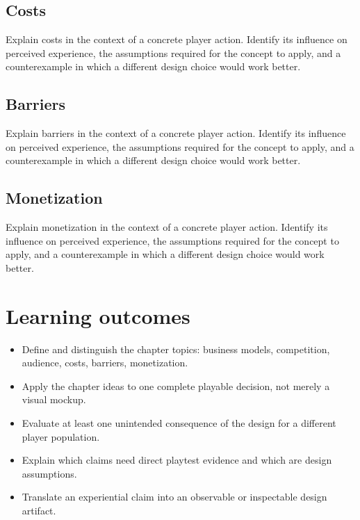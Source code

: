 \documentclass[11pt]{article}
\begin{document}
\subsection{Costs}
Explain costs in the context of a concrete player action. Identify its influence on perceived experience, the assumptions required for the concept to apply, and a counterexample in which a different design choice would work better.


\subsection{Barriers}
Explain barriers in the context of a concrete player action. Identify its influence on perceived experience, the assumptions required for the concept to apply, and a counterexample in which a different design choice would work better.


\subsection{Monetization}
Explain monetization in the context of a concrete player action. Identify its influence on perceived experience, the assumptions required for the concept to apply, and a counterexample in which a different design choice would work better.


\section{Learning outcomes}
\begin{itemize}
\item Define and distinguish the chapter topics: business models, competition, audience, costs, barriers, monetization.
\item Apply the chapter ideas to one complete playable decision, not merely a visual mockup.
\item Evaluate at least one unintended consequence of the design for a different player population.
\item Explain which claims need direct playtest evidence and which are design assumptions.
\item Translate an experiential claim into an observable or inspectable design artifact.
\end{itemize}
\end{document}
